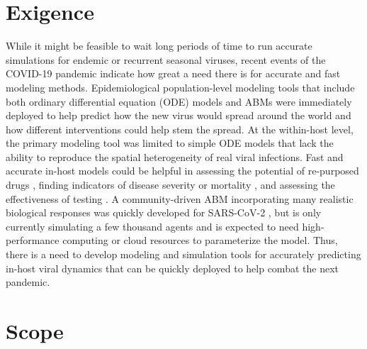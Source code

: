 \section{Exigence}
While it might be feasible to wait long periods of time to run accurate simulations for endemic or recurrent seasonal viruses, recent events of the COVID-19 pandemic indicate how great a need there is for accurate and fast modeling methods. Epidemiological population-level modeling tools that include both ordinary differential equation (ODE) models \citep{li20,ngonghala20} and ABMs \citep{ying21,sneppen21,kano21} were immediately deployed to help predict how the new virus would spread around the world and how different interventions could help stem the spread. At the within-host level, the primary modeling tool was limited to simple ODE models \citep{goncalves20,wang20model,hernandez20,dogra20} that lack the ability to reproduce the spatial heterogeneity of real viral infections. Fast and accurate in-host models could be helpful in assessing the potential of re-purposed drugs \citep{czuppon21,goncalves20,dodds20}, finding indicators of disease severity or mortality \citep{neant21}, and assessing the effectiveness of testing \citep{ejima21}. A community-driven ABM incorporating many realistic biological responses was quickly developed for SARS-CoV-2 \citep{getz21}, but is only currently simulating a few thousand agents and is expected to need high-performance computing or cloud resources to parameterize the model. Thus, there is a need to develop modeling and simulation tools for accurately predicting in-host viral dynamics that can be quickly deployed to help combat the next pandemic.

\section{Scope}

